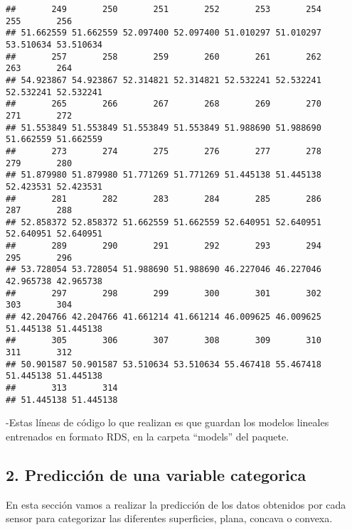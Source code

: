 \documentclass[
]{article}
\newenvironment{Shaded}{\begin{snugshade}}{\end{snugshade}}
\newcommand{\ControlFlowTok}[1]{\textcolor[rgb]{0.13,0.29,0.53}{\textbf{#1}}}
\newcommand{\FunctionTok}[1]{\textcolor[rgb]{0.00,0.00,0.00}{#1}}
\newcommand{\NormalTok}[1]{#1}
\newcommand{\OtherTok}[1]{\textcolor[rgb]{0.56,0.35,0.01}{#1}}
\newcommand{\SpecialCharTok}[1]{\textcolor[rgb]{0.00,0.00,0.00}{#1}}
\newcommand{\StringTok}[1]{\textcolor[rgb]{0.31,0.60,0.02}{#1}}
\begin{document}
\begin{verbatim}
##       249       250       251       252       253       254       255       256 
## 51.662559 51.662559 52.097400 52.097400 51.010297 51.010297 53.510634 53.510634 
##       257       258       259       260       261       262       263       264 
## 54.923867 54.923867 52.314821 52.314821 52.532241 52.532241 52.532241 52.532241 
##       265       266       267       268       269       270       271       272 
## 51.553849 51.553849 51.553849 51.553849 51.988690 51.988690 51.662559 51.662559 
##       273       274       275       276       277       278       279       280 
## 51.879980 51.879980 51.771269 51.771269 51.445138 51.445138 52.423531 52.423531 
##       281       282       283       284       285       286       287       288 
## 52.858372 52.858372 51.662559 51.662559 52.640951 52.640951 52.640951 52.640951 
##       289       290       291       292       293       294       295       296 
## 53.728054 53.728054 51.988690 51.988690 46.227046 46.227046 42.965738 42.965738 
##       297       298       299       300       301       302       303       304 
## 42.204766 42.204766 41.661214 41.661214 46.009625 46.009625 51.445138 51.445138 
##       305       306       307       308       309       310       311       312 
## 50.901587 50.901587 53.510634 53.510634 55.467418 55.467418 51.445138 51.445138 
##       313       314 
## 51.445138 51.445138
\end{verbatim}

-Estas líneas de código lo que realizan es que guardan los modelos
lineales entrenados en formato RDS, en la carpeta ``models'' del
paquete.

\hypertarget{predicciuxf3n-de-una-variable-categorica}{%
\subsection{2. Predicción de una variable
categorica}\label{predicciuxf3n-de-una-variable-categorica}}

En esta sección vamos a realizar la predicción de los datos obtenidos
por cada sensor para categorizar las diferentes superficies, plana,
concava o convexa.

\begin{Shaded}
\end{Shaded}
\end{document}
